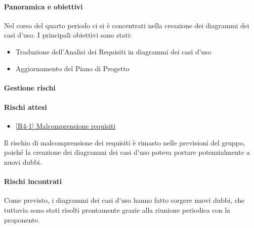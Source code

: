 \documentclass[a4paper,12pt]{article}
\begin{document}
            \paragraph{Panoramica e obiettivi}
            Nel corso del quarto periodo ci si è concentrati nella creazione dei diagrammi dei casi d'uso. I principali obiettivi sono stati:
            \begin{itemize}
                \item Traduzione dell'Analisi dei Requisiti in diagrammi dei casi d'uso
                \item Aggiornamento del Piano di Progetto
            \end{itemize}
            \paragraph{Gestione rischi}
            \paragraph*{Rischi attesi}
                \begin{itemize}
                    \item\hyperref[tab:r4]{[R4-1] Malcomprensione requisiti}
                \end{itemize}
                Il rischio di malcomprensione dei requisiti è rimasto nelle previsioni del gruppo, poiché la creazione dei diagrammi dei casi d'uso poteva portare potenzialmente a nuovi dubbi.

            \paragraph*{Rischi incontrati}
            Come previsto, i diagrammi dei casi d'uso hanno fatto sorgere nuovi dubbi, che tuttavia sono stati risolti prontamente grazie alla riunione periodica con la proponente.
            
\end{document}
